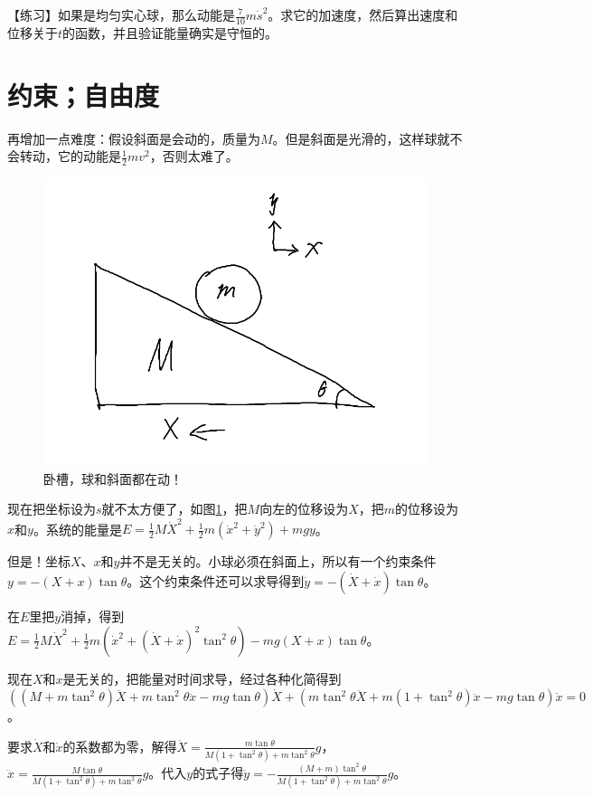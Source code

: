 【练习】如果是均匀实心球，那么动能是$\frac{7}{10} m \dot s^2$。求它的加速度，然后算出速度和位移关于$t$的函数，并且验证能量确实是守恒的。
\section{约束；自由度}
再增加一点难度：假设斜面是会动的，质量为$M$。但是斜面是光滑的，这样球就不会转动，它的动能是$\frac{1}{2} m v^2$，否则太难了。
\begin{figure}[htb]
\centering
\includegraphics[scale=0.5]{fig/slope-ball-2.png}
\caption{卧槽，球和斜面都在动！}
\label{fig-slope-ball-2}
\end{figure}

现在把坐标设为$s$就不太方便了，如图\ref{fig-slope-ball-2}，把$M$向左的位移设为$X$，把$m$的位移设为$x$和$y$。系统的能量是$E=\frac{1}{2} M \dot X^2+\frac{1}{2} m (\dot x^2+\dot y^2)+m g y$。

但是！坐标$X$、$x$和$y$并不是无关的。小球必须在斜面上，所以有一个约束条件$y=-(X+x) \tan \theta$。这个约束条件还可以求导得到$\dot y=-(\dot X+\dot x) \tan \theta$。

在$E$里把$y$消掉，得到$E=\frac{1}{2} M \dot X^2+\frac{1}{2} m (\dot x^2+(\dot X+\dot x)^2 \tan^2 \theta)-m g (X+x) \tan \theta$。

现在$X$和$x$是无关的，把能量对时间求导，经过各种化简得到$((M+m \tan^2 \theta) \ddot X+m \tan^2 \theta \ddot x-m g \tan \theta)\dot X+(m \tan^2 \theta \ddot X+m (1+\tan^2 \theta) \ddot x-m g \tan \theta)\dot x=0$。

要求$\dot X$和$\dot x$的系数都为零，解得$\ddot X=\frac{m \tan \theta}{M (1+\tan^2 \theta)+m \tan^2 \theta} g$，$\ddot x=\frac{M \tan \theta}{M (1+\tan^2 \theta)+m \tan^2 \theta} g$。代入$y$的式子得$\ddot y=-\frac{(M+m) \tan^2 \theta}{M (1+\tan^2 \theta)+m \tan^2 \theta} g$。

